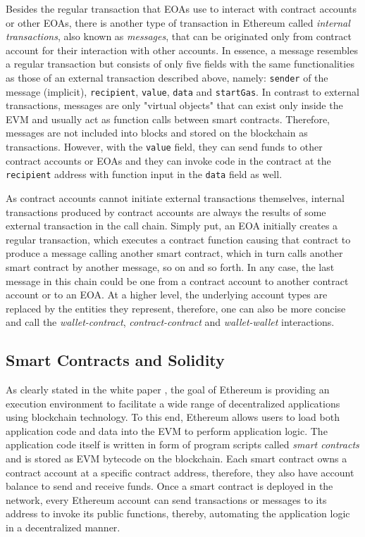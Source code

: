 Besides the regular transaction that EOAs use to interact with contract accounts or other EOAs, there is another type of transaction in Ethereum called \textit{internal transactions}, also known as \textit{messages}, that can be originated only from contract account for their interaction with other accounts. In essence, a message resembles a regular transaction but consists of only five fields with the same functionalities as those of an external transaction described above, namely: \texttt{sender} of the message (implicit), \texttt{recipient}, \texttt{value}, \texttt{data} and \texttt{startGas}. In contrast to external transactions, messages are only "virtual objects" that can exist only inside the EVM and usually act as function calls between smart contracts. Therefore, messages are not included into blocks and stored on the blockchain as transactions. However, with the \texttt{value} field, they can send funds to other contract accounts or EOAs and they can invoke code in the contract at the \texttt{recipient} address with function input in the \texttt{data} field as well.

As contract accounts cannot initiate external transactions themselves, internal transactions produced by contract accounts are always the results of some external transaction in the call chain. Simply put, an EOA initially creates a regular transaction, which executes a contract function causing that contract to produce a message calling another smart contract, which in turn calls another smart contract by another message, so on and so forth. In any case, the last message in this chain could be one from a contract account to another contract account or to an EOA. At a higher level, the underlying account types are replaced by the entities they represent, therefore, one can also be more concise and call the \textit{wallet-contract}, \textit{contract-contract} and \textit{wallet-wallet} interactions.

\subsection{Smart Contracts and Solidity} \label{subsec:smartcontract}

As clearly stated in the white paper \cite{buterin2014next}, the goal of Ethereum is providing an execution environment to facilitate a wide range of decentralized applications using blockchain technology. To this end, Ethereum allows users to load both application code and data into the EVM to perform application logic. The application code itself is written in form of program scripts called \textit{smart contracts} and is stored as EVM bytecode on the blockchain. Each smart contract owns a contract account at a specific contract address, therefore, they also have account balance to send and receive funds. Once a smart contract is deployed in the network, every Ethereum account can send transactions or messages to its address to invoke its public functions, thereby, automating the application logic in a decentralized manner. 


